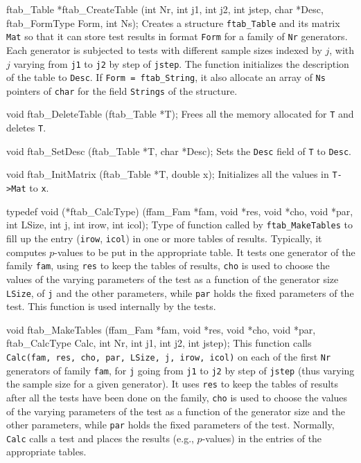 \code

ftab_Table *ftab_CreateTable (int Nr, int j1, int j2, int jstep,
                              char *Desc, ftab_FormType Form, int Ns);
\endcode
\tab
  Creates a structure {\tt ftab\_Table} and its matrix {\tt Mat} so that
  it can store test results in format {\tt Form} for a family of {\tt Nr}
  generators. Each generator is subjected to tests with different sample sizes
  indexed by $j$, with $j$  varying from {\tt j1} to {\tt j2} by step of
  {\tt jstep}. The function initializes the description of the table to
  {\tt Desc}. If {\tt Form = ftab\_String}, it also allocate an array of
  {\tt Ns} pointers of  {\tt char} for the field  {\tt Strings} of the
  structure.
\endtab
\code


void ftab_DeleteTable (ftab_Table *T);
\endcode
\tab
   Frees all the memory allocated for {\tt T} and deletes {\tt T}.
\endtab
\code


void ftab_SetDesc (ftab_Table *T, char *Desc);
\endcode
 \tab
 Sets the {\tt Desc} field of {\tt T} to {\tt Desc}.
\endtab
\code


void ftab_InitMatrix (ftab_Table *T, double x);
\endcode
\tab
  Initializes all the values in {\tt T->Mat} to {\tt x}.
\endtab
\code


typedef void (*ftab_CalcType) (ffam_Fam *fam, void *res, void *cho,
                               void *par, int LSize, int j,
                               int irow, int icol);
\endcode
 \tab  Type of function called by {\tt ftab\_MakeTables} to fill up
  the entry ({\tt irow}, {\tt icol}) in one or more tables of results.
  Typically, it computes $p$-values to be put in the appropriate table.
  It tests one generator of the family {\tt fam}, using {\tt res} to keep
  the tables of results, {\tt cho} is used to choose the values of the
  varying parameters of the test as a function of the generator size
  {\tt LSize}, of {\tt j} and the other parameters, while {\tt par} holds
  the fixed parameters of the test.
  This function is used internally by the tests.
\endtab
\code


void ftab_MakeTables (ffam_Fam *fam, void *res, void *cho, void *par,
                      ftab_CalcType Calc,
                      int Nr, int j1, int j2, int jstep);
\endcode
\tab This function calls {\tt Calc(fam, res, cho, par, LSize, j, irow, icol)}
  on each of the first {\tt Nr} generators of family {\tt fam}, for
  {\tt j} going from {\tt j1} to {\tt j2} by step of {\tt jstep} (thus varying
  the sample size for a given generator).
  It uses {\tt res} to keep the tables of results after all the tests have
  been done on the family,  {\tt cho} is used to choose the values of the
  varying parameters of the test as a function of the generator size and
  the other parameters, while {\tt par} holds the fixed parameters of the
  test. Normally, {\tt Calc} calls a test and places the results
  (e.g., $p$-values) in the entries of the appropriate tables.
\endtab



